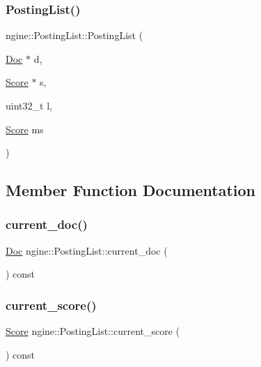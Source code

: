 \subsubsection{\texorpdfstring{Posting\+List()}{PostingList()}\hspace{0.1cm}{\footnotesize\ttfamily [2/2]}}
{\footnotesize\ttfamily ngine\+::\+Posting\+List\+::\+Posting\+List (\begin{DoxyParamCaption}\item[{\hyperlink{structngine_1_1Doc}{Doc} $\ast$}]{d,  }\item[{\hyperlink{structngine_1_1Score}{Score} $\ast$}]{s,  }\item[{uint32\+\_\+t}]{l,  }\item[{\hyperlink{structngine_1_1Score}{Score}}]{ms }\end{DoxyParamCaption})\hspace{0.3cm}{\ttfamily [inline]}}



\subsection{Member Function Documentation}
\mbox{\label{structngine_1_1PostingList_a25beb7e8eba030e57290f72277ab6893}} 
\subsubsection{\texorpdfstring{current\+\_\+doc()}{current\_doc()}}
{\footnotesize\ttfamily \hyperlink{structngine_1_1Doc}{Doc} ngine\+::\+Posting\+List\+::current\+\_\+doc (\begin{DoxyParamCaption}{ }\end{DoxyParamCaption}) const\hspace{0.3cm}{\ttfamily [inline]}}

\mbox{\label{structngine_1_1PostingList_a028af2db5a5232f15a12e914c13be902}} 
\subsubsection{\texorpdfstring{current\+\_\+score()}{current\_score()}}
{\footnotesize\ttfamily \hyperlink{structngine_1_1Score}{Score} ngine\+::\+Posting\+List\+::current\+\_\+score (\begin{DoxyParamCaption}{ }\end{DoxyParamCaption}) const\hspace{0.3cm}{\ttfamily [inline]}}

